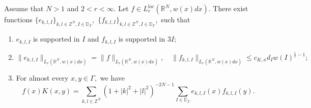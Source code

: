 \documentclass{amsart}
\numberwithin{equation}{section}
\begin{document}
\begin{lemma}\label{lem:rank-one-decomposition-Dunkl} Assume that $N>1$ and $2<r<\infty.$ Let $f\in L_r^{\mathrm{loc}}(\mathbb{R} ^N,w(x)dx).$ There exist functions
$
\{e_{k,l,I}\}_{k,l\in\mathbb{Z}^N,I\in\mathbb{D}_{\Gamma}},$ $
\{f_{k,l,I}\}_{k,l\in\mathbb{Z}^N,I\in\mathbb{D}_{\Gamma}},$
such that
\begin{enumerate}[{\rm (i)}]
\item $e_{k,l,I}$ is supported in $I$ and $f_{k,l,I}$ is supported in $3I;$
\item
$$\|e_{k,l,I}\|_{L_r(\mathbb{R}^N,w(x)dx)}=\|f\|_{L_r(\mathbb{R}^N,w(x)dx)},\quad \|f_{k,l,I}\|_{L_r(\mathbb{R}^N,w(x)dx)}\leq c_{K,\kappa}d_Iw(I)^{\frac1r-1};$$
\item For almost every $x,y\in\Gamma,$ we have
\begin{equation}\label{eq:Dunkl-kernel-rank-one-new}
f(x)K(x,y)=\sum_{k,l\in\mathbb{Z}^N}(1+|k|^2+|l|^2)^{-2N-1}\sum_{I\in\mathbb{D}_{\Gamma}}e_{k,l,I}(x)f_{k,l,I}(y).
\end{equation}
\end{enumerate}
\end{lemma}
\end{document}
